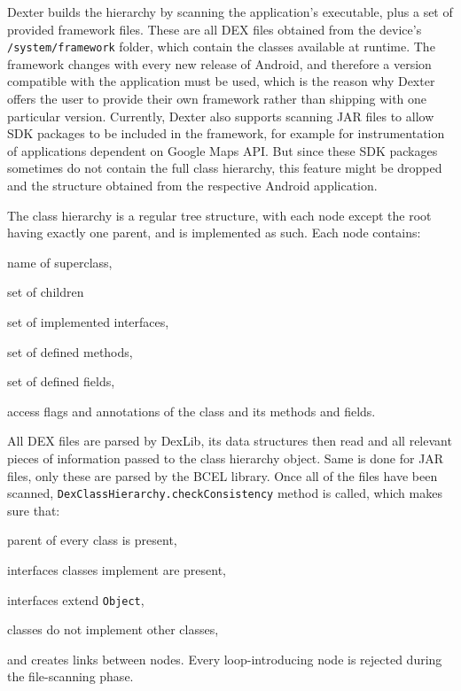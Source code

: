 \documentclass[12pt,twoside,notitlepage]{report}
\begin{document}
Dexter builds the hierarchy by scanning the application's executable, plus a set of provided framework files. These are all DEX files obtained from the device's \verb$/system/framework$ folder, which contain the classes available at runtime. The framework changes with every new release of Android, and therefore a version compatible with the application must be used, which is the reason why Dexter offers the user to provide their own framework rather than shipping with one particular version. Currently, Dexter also supports scanning JAR files to allow SDK packages to be included in the framework, for example for instrumentation of applications dependent on Google Maps API. But since these SDK packages sometimes do not contain the full class hierarchy, this feature might be dropped and the structure obtained from the respective Android application.

The class hierarchy is a regular tree structure, with each node except the root having exactly one parent, and is implemented as such. Each node contains:
\begin{inparaenum}[(i)]
\item name of superclass,
\item set of children
\item set of implemented interfaces,
\item set of defined methods,
\item set of defined fields,
\item access flags and annotations of the class and its methods and fields.
\end{inparaenum}

All DEX files are parsed by DexLib, its data structures then read and all relevant pieces of information passed to the class hierarchy object. Same is done for JAR files, only these are parsed by the BCEL library. Once all of the files have been scanned, \verb$DexClassHierarchy.checkConsistency$ method is called, which makes sure that:
\begin{inparaenum}[(i)]
\item parent of every class is present,
\item interfaces classes implement are present,
\item interfaces extend \verb$Object$,
\item classes do not implement other classes,
\end{inparaenum}
and creates links between nodes. Every loop-introducing node is rejected during the file-scanning phase.
\end{document}
